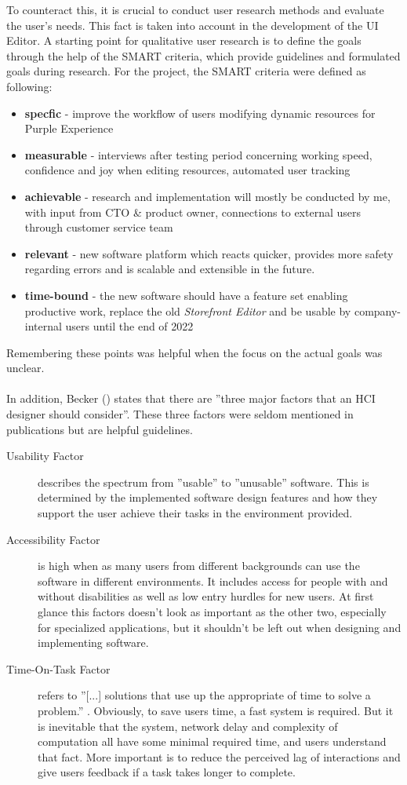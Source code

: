 To counteract this, it is crucial to conduct user research methods and evaluate the user's needs.
This fact is taken into account in the development of the UI Editor.
A starting point for qualitative user research is to define the goals through the help of the SMART criteria, which provide guidelines and formulated goals during research.
For the project, the SMART criteria were defined as following:
\begin{itemize}
  \item \textbf{specfic} - improve the workflow of users modifying dynamic resources for Purple Experience
  \item \textbf{measurable} - interviews after testing period concerning working speed, confidence and joy when editing resources, automated user tracking
  \item \textbf{achievable} - research and implementation will mostly be conducted by me, with input from CTO \& product owner, connections to external users through customer service team
  \item \textbf{relevant} - new software platform which reacts quicker, provides more safety regarding errors and is scalable and extensible in the future.
  \item \textbf{time-bound} - the new software should have a feature set enabling productive work, replace the old \textit{Storefront Editor} and be usable by company-internal users until the end of 2022
\end{itemize}
Remembering these points was helpful when the focus on the actual goals was unclear.
\\\\
In addition, Becker (\cite[pp. 37-41]{LearnHCI:2020ys}) states that there are ''three major factors that an HCI designer should consider''.
These three factors were seldom mentioned in publications but are helpful guidelines.
\begin{description}
  \item[Usability Factor] describes the spectrum from ''usable'' to ''unusable'' software. This is determined by the implemented software design features and how they support the user achieve their tasks in the environment provided.
  \item[Accessibility Factor] is high when as many users from different backgrounds can use the software in different environments. 
  It includes access for people with and without disabilities as well as low entry hurdles for new users.
  At first glance this factors doesn't look as important as the other two, especially for specialized applications, but it shouldn't be left out when designing and implementing software.
  \item[Time-On-Task Factor] refers to ''[...] solutions that use up the appropriate of time to solve a problem.'' \Cite[p. 40]{LearnHCI:2020ys}. Obviously, to save users time, a fast system is required.
But it is inevitable that the system, network delay and complexity of computation all have some minimal required time, and users understand that fact. More important is to reduce the perceived lag of interactions and give users feedback if a task takes longer to complete.
\end{description}

